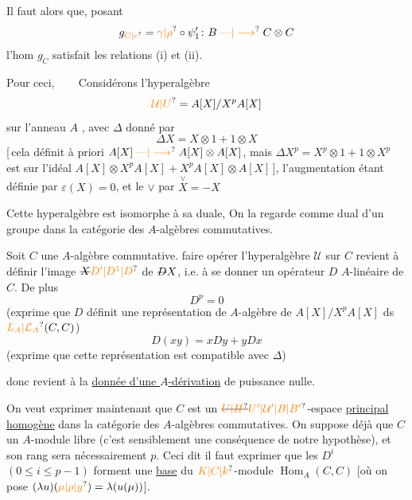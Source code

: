 Il faut  alors que, posant
\[
g_{\unsure{C|c}}=\unsure{\gamma|\rho}\circ\psi'_1
  \colon B\mathrel{\unsure{\text{\textemdash}|\longrightarrow}}C\otimes C
\]
l'hom $g_C$ satisfait les relations (i) et (ii).

Pour ceci, \textendash\ \textendash\ \textendash\ \textendash
Considérons l'hyperalgèbre
\[
\unsure{\mathcal U|U}=A[X]/X^pA[X]
\]
sur l'anneau $A$ , avec $\Delta$ donné par
\[
\boxed{\Delta X=X\otimes1+1\otimes X}
\]
[\,cela définit à priori $A[X]\mathrel{\unsure{\text{\textemdash}|\longrightarrow}}A[X]\otimes A[X]$, mais
$\Delta X^p=X^p\otimes1+1\otimes X^p$ est  sur l'idéal
$A[X]\otimes X^pA[X]+X^pA[X]\otimes A[X]$\,], l'augmentation étant définie par
 $\boxed{\varepsilon(X)=0}$, et le $\vee$ par $\boxed{\overset{\vee}{X}=-X}$

Cette hyperalgèbre est isomorphe à sa duale, 
On la regarde comme  dual d'un groupe dans la catégorie des $A$-algèbres commutatives.

Soit $C$ une $A$-algèbre commutative.  faire opérer l'hyperalgèbre $\mathcal U$ sur $C$ revient à définir l'image $\deleted{X}\unsure{D'|D^{1}|D}$ de $\deleted{D}X$, i.e. à se donner un opérateur $D$ $A$-linéaire de $C$. De plus
\[
D^p=0\tag*{(i)}
\]
(exprime que $D$ définit une représentation de $A$-algèbre de $A[X]/X^pA[X]$ ds $\unsure{L_A|\mathcal L_A}(C,C)$)
\[
D(xy)=xDy+yDx\tag*{(ii)}
\]
(exprime que cette représentation est compatible avec $\Delta$)

donc  revient à la \uline{donnée d'une $A$-dérivation} de puissance  nulle.

On veut exprimer maintenant que $C$ est un $\deleted{\unsure{U|H}}\unsure{U'|\mathcal U'|B|B'}$-espace \uline{principal} \uline{homogène} dans la catégorie des $A$-algèbres commutatives. On suppose  déjà que $C$   un $A$-module libre (c'est sensiblement une
conséquence de notre hypothèse), et  son rang sera nécessairement $p$. Ceci dit il faut exprimer que les $D^i$ $(0\leq i\leq p-1)$ forment une \uline{base} du $\unsure{K|C|k}$-module $\operatorname{Hom}_A(C,C)$ [où on pose $(\lambda u)(\unsure{\mu|\rho|y})=\lambda(u(\mu))$].

